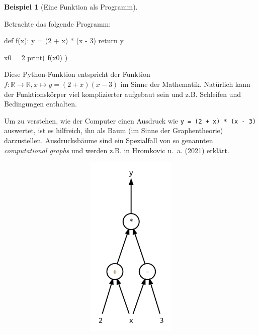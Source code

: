 \documentclass[
  a4paper,
  DIV=11]{scrreprt}
\newenvironment{Shaded}{\begin{snugshade}}{\end{snugshade}}
\newcommand{\BuiltInTok}[1]{\textcolor[rgb]{0.00,0.23,0.31}{#1}}
\newcommand{\ControlFlowTok}[1]{\textcolor[rgb]{0.00,0.23,0.31}{#1}}
\newcommand{\DecValTok}[1]{\textcolor[rgb]{0.68,0.00,0.00}{#1}}
\newcommand{\KeywordTok}[1]{\textcolor[rgb]{0.00,0.23,0.31}{#1}}
\newcommand{\NormalTok}[1]{\textcolor[rgb]{0.00,0.23,0.31}{#1}}
\newcommand{\OperatorTok}[1]{\textcolor[rgb]{0.37,0.37,0.37}{#1}}
\theoremstyle{definition}
\theoremstyle{definition}
\newtheorem{example}{Beispiel}[chapter]
\theoremstyle{remark}
\begin{document}
\begin{example}[Eine Funktion als
Programm]\protect\hypertarget{exm-FirstFunctionAsProgram}{}\label{exm-FirstFunctionAsProgram}

Betrachte das folgende Programm:

\begin{Shaded}
\begin{Highlighting}[]
\KeywordTok{def}\NormalTok{ f(x):}
\NormalTok{    y }\OperatorTok{=}\NormalTok{ (}\DecValTok{2} \OperatorTok{+}\NormalTok{ x) }\OperatorTok{*}\NormalTok{ (x }\OperatorTok{{-}} \DecValTok{3}\NormalTok{)}
    \ControlFlowTok{return}\NormalTok{ y}

\NormalTok{x0 }\OperatorTok{=} \DecValTok{2}
\BuiltInTok{print}\NormalTok{( f(x0) )}
\end{Highlighting}
\end{Shaded}

Diese Python-Funktion entspricht der Funktion
\(f:\mathbb{R}\rightarrow\mathbb{R} , x \mapsto y=(2+x)(x-3)\) im Sinne
der Mathematik. Natürlich kann der Funktionskörper viel komplizierter
aufgebaut sein und z.B. Schleifen und Bedingungen enthalten.

Um zu verstehen, wie der Computer einen Ausdruck wie
\texttt{y\ =\ (2\ +\ x)\ *\ (x\ -\ 3)} auswertet, ist es hilfreich, ihn
als Baum (im Sinne der Graphentheorie) darzustellen. Ausdrucksbäume sind
ein Spezialfall von so genannten \emph{computational graphs} und werden
z.B. in Hromkovic u.~a. (2021) erklärt.

\begin{figure}

{\centering 

\begin{figure}[H]

{\centering \includegraphics[width=5.5in,height=3.5in]{intro_files/figure-latex/dot-figure-1.png}

}
\end{figure}}
\end{figure}
\end{example}
\end{document}
